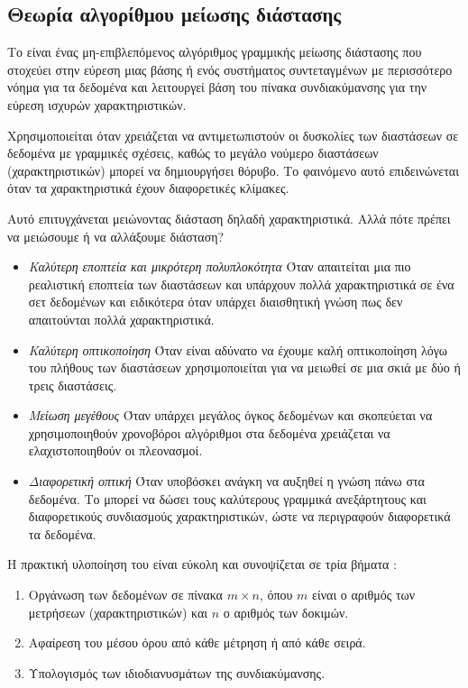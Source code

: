\subsection{Θεωρία αλγορίθμου μείωσης διάστασης}
Το  είναι ένας μη-επιβλεπόμενος αλγόριθμος γραμμικής μείωσης διάστασης που στοχεύει στην εύρεση μιας βάσης ή ενός συστήματος συντεταγμένων με περισσότερο νόημα για τα δεδομένα και λειτουργεί βάση του πίνακα συνδιακύμανσης για την εύρεση ισχυρών χαρακτηριστικών.\par
Χρησιμοποιείται όταν χρειάζεται να αντιμετωπιστούν οι δυσκολίες των διαστάσεων σε δεδομένα με γραμμικές σχέσεις, καθώς το μεγάλο νούμερο διαστάσεων (χαρακτηριστικών) μπορεί να δημιουργήσει θόρυβο. Το φαινόμενο αυτό επιδεινώνεται όταν τα χαρακτηριστικά έχουν διαφορετικές κλίμακες.\par
Αυτό επιτυγχάνεται μειώνοντας διάσταση δηλαδή χαρακτηριστικά. Αλλά πότε πρέπει να μειώσουμε ή να αλλάξουμε διάσταση?
\begin{itemize}
\item \emph{Καλύτερη εποπτεία και μικρότερη πολυπλοκότητα} Όταν απαιτείται μια πιο ρεαλιστική εποπτεία των διαστάσεων και υπάρχουν πολλά χαρακτηριστικά σε ένα σετ δεδομένων και ειδικότερα όταν υπάρχει διαισθητική γνώση πως δεν απαιτούνται πολλά χαρακτηριστικά.
\item \emph{Καλύτερη οπτικοποίηση}  Όταν είναι αδύνατο να έχουμε καλή οπτικοποίηση λόγω του πλήθους των διαστάσεων χρησιμοποιείται  για να μειωθεί σε μια σκιά με δύο ή τρεις διαστάσεις.
\item \emph{Μείωση μεγέθους} Όταν υπάρχει μεγάλος όγκος δεδομένων και σκοπεύεται να χρησιμοποιηθούν χρονοβόροι αλγόριθμοι στα δεδομένα χρειάζεται να ελαχιστοποιηθούν οι πλεονασμοί.
\item \emph{Διαφορετική οπτική} Όταν υποβόσκει ανάγκη να αυξηθεί η γνώση πάνω στα δεδομένα. Το  μπορεί να δώσει τους καλύτερους γραμμικά ανεξάρτητους και διαφορετικούς συνδιασμούς χαρακτηριστικών, ώστε να περιγραφούν διαφορετικά τα δεδομένα.
\end{itemize}
Η πρακτική υλοποίηση του  είναι εύκολη και συνοψίζεται σε τρία βήματα \cite{PCA}:
\begin{enumerate}
\item Οργάνωση των δεδομένων σε πίνακα $m \times n$, όπου $m$ είναι ο αριθμός των μετρήσεων (χαρακτηριστικών) και $n$ ο αριθμός των δοκιμών.
\item Αφαίρεση του μέσου όρου από κάθε μέτρηση ή από κάθε σειρά.
\item Υπολογισμός  των ιδιοδιανυσμάτων της συνδιακύμανσης.
\end{enumerate}
